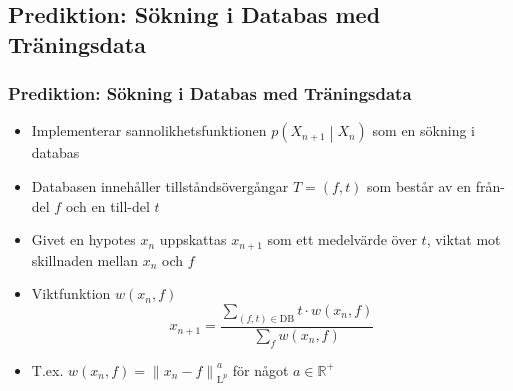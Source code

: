 \documentclass[]{beamer}
\renewcommand{\ae}{\"{a}}
\renewcommand{\oe}{\"{o}}
\newcommand{\prob}[1]{p\left(#1\right)}
\newcommand{\cprob}[2]{\prob{\left. #1 \middle\vert #2 \right.}}
\newcommand{\cprobnext}[1]{\cprob{#1_{n+1}}{#1_n}}
\newcommand{\norm}[1]{\left\|#1\right\|}
\newcommand{\Lp}[1]{\mathrm{L}^{#1}}
\newcommand{\bbset}[1]{\mathbb{#1}}
\newcommand{\RP}{\bbset{R}^+}
\begin{document}
\subsection{Prediktion: S\oe kning i Databas med Tr\ae ningsdata}
\begin{frame}
  \frametitle{Prediktion: S\oe kning i Databas med Tr\ae ningsdata}
  \begin{itemize}
  \item Implementerar sannolikhetsfunktionen $\cprobnext{X}$ som en s\oe kning i databas
  \item Databasen inneh\aa ller tillst\aa nds\oe verg\aa ngar $T = (f, t)$ som best\aa r av en fr\aa n-del $f$ och en till-del $t$
  \item Givet en hypotes $x_n$ uppskattas $x_{n+1}$ som ett medelv\ae rde \oe ver $t$, viktat mot skillnaden mellan $x_n$ och $f$
  \item Viktfunktion $w(x_n, f)$
    \begin{equation*}
      x_{n+1} = \frac{\sum\limits_{(f, t) \in \mathrm{DB}} t \cdot w(x_n, f)}{\sum\limits_f w(x_n, f)}
    \end{equation*}
  \item T.ex. $w(x_n, f) = \norm{x_n - f}_{\Lp{p}}^a$ f\oe r n\aa got $a\in \RP$
  \end{itemize}
\end{frame}
\end{document}
